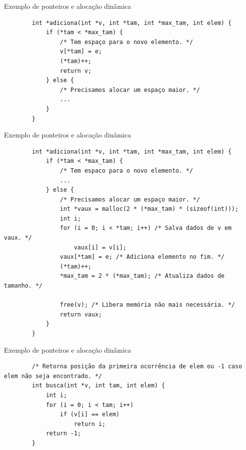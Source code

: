\documentclass[handout]{beamer}
\begin{document}
\begin{frame}[fragile]{Exemplo de ponteiros e alocação dinâmica}

    \begin{verbatim}
        int *adiciona(int *v, int *tam, int *max_tam, int elem) {
            if (*tam < *max_tam) {
                /* Tem espaço para o novo elemento. */
                v[*tam] = e;
                (*tam)++;
                return v;
            } else {
                /* Precisamos alocar um espaço maior. */
                ...
            }
        }
    \end{verbatim}

\end{frame}

\begin{frame}[fragile]{Exemplo de ponteiros e alocação dinâmica}

    \begin{verbatim}
        int *adiciona(int *v, int *tam, int *max_tam, int elem) {
            if (*tam < *max_tam) {
                /* Tem espaco para o novo elemento. */
                ...
            } else {
                /* Precisamos alocar um espaço maior. */
                int *vaux = malloc(2 * (*max_tam) * (sizeof(int)));
                int i;
                for (i = 0; i < *tam; i++) /* Salva dados de v em vaux. */
                    vaux[i] = v[i];
                vaux[*tam] = e; /* Adiciona elemento no fim. */
                (*tam)++;
                *max_tam = 2 * (*max_tam); /* Atualiza dados de tamanho. */
                
                free(v); /* Libera memória não mais necessária. */
                return vaux;
            }
        }
    \end{verbatim}

\end{frame}

\begin{frame}[fragile]{Exemplo de ponteiros e alocação dinâmica}

    \begin{verbatim}
        /* Retorna posição da primeira ocorrência de elem ou -1 caso elem não seja encontrado. */
        int busca(int *v, int tam, int elem) {
            int i;
            for (i = 0; i < tam; i++)
                if (v[i] == elem)
                    return i;
            return -1;
        }
    \end{verbatim}

\end{frame}
\end{document}
